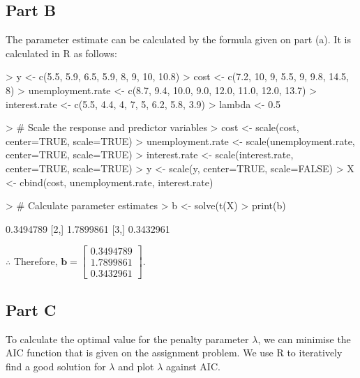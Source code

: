 \documentclass{article}
\begin{document}
\subsection{Part B}
The parameter estimate can be calculated by the formula given on part (a). It is calculated in R as follows:
\begin{Schunk}
\begin{Sinput}
> y <- c(5.5, 5.9, 6.5, 5.9, 8, 9, 10, 10.8)
> cost <- c(7.2, 10, 9, 5.5, 9, 9.8, 14.5, 8)
> unemployment.rate <- c(8.7, 9.4, 10.0, 9.0, 12.0, 11.0, 12.0, 13.7)
> interest.rate <- c(5.5, 4.4, 4, 7, 5, 6.2, 5.8, 3.9)
> lambda <- 0.5
\end{Sinput}
\end{Schunk}

\begin{Schunk}
\begin{Sinput}
> # Scale the response and predictor variables
> cost <- scale(cost, center=TRUE, scale=TRUE)
> unemployment.rate <- scale(unemployment.rate, center=TRUE, scale=TRUE)
> interest.rate <- scale(interest.rate, center=TRUE, scale=TRUE)
> y <- scale(y, center=TRUE, scale=FALSE)
> X <- cbind(cost, unemployment.rate, interest.rate)
\end{Sinput}
\end{Schunk}

\begin{Schunk}
\begin{Sinput}
> # Calculate parameter estimates
> b <- solve(t(X) %
> print(b)
\end{Sinput}
\begin{Soutput}
          [,1]
[1,] 0.3494789
[2,] 1.7899861
[3,] 0.3432961
\end{Soutput}
\end{Schunk}

\noindent $\therefore$ Therefore, $\textbf{b} = \begin{bmatrix}0.3494789 \\ 1.7899861 \\ 0.3432961\end{bmatrix}$.

\subsection{Part C}
To calculate the optimal value for the penalty parameter $\lambda$, we can minimise the AIC function that is given on the assignment problem. We use R to iteratively find a good solution for $\lambda$ and plot $\lambda$ against AIC.
\end{document}
